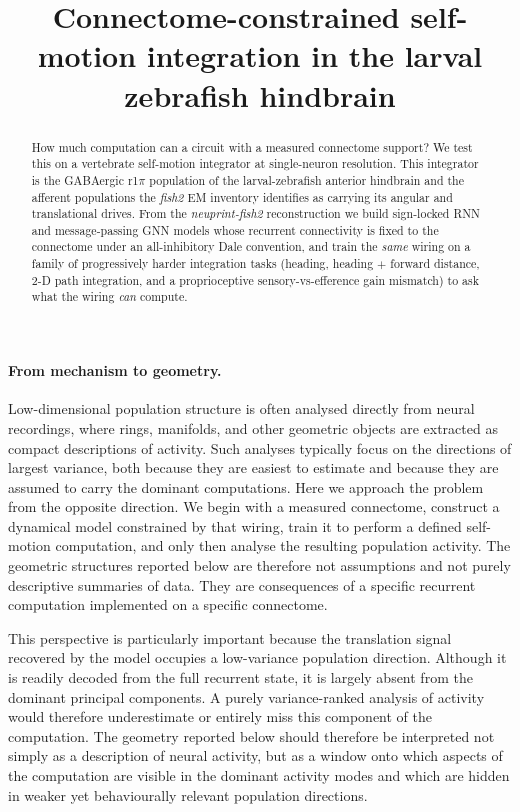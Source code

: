 \documentclass[11pt]{article}
\title{\textbf{Connectome-constrained self-motion integration in the larval
zebrafish hindbrain}}
\author{}
\date{}
\def\rpi{r1\ensuremath{\pi}}
\begin{document}
\maketitle
\begin{abstract}
How much computation can a circuit with a measured connectome support?
We test this on a vertebrate
self-motion integrator at single-neuron resolution. This integrator is the GABAergic
\rpi{} population of the larval-zebrafish anterior hindbrain and the
afferent populations the \emph{fish2} EM inventory identifies as
carrying its angular and translational drives. From the
\emph{neuprint-fish2} reconstruction we build sign-locked RNN and
message-passing GNN models whose recurrent connectivity is fixed to the
connectome under an all-inhibitory Dale convention, and train the
\emph{same} wiring on a family of progressively harder integration
tasks (heading, heading $+$ forward distance, 2-D path integration,
and a proprioceptive sensory-vs-efference gain mismatch) to ask what
the wiring \emph{can} compute.
\end{abstract}

\paragraph{From mechanism to geometry.}
Low-dimensional population structure is often analysed directly from neural
recordings, where rings, manifolds, and other geometric objects are extracted
as compact descriptions of activity. Such analyses typically focus on the
directions of largest variance, both because they are easiest to estimate and
because they are assumed to carry the dominant computations. Here we approach
the problem from the opposite direction. We begin with a measured connectome,
construct a dynamical model constrained by that wiring, train it to perform a
defined self-motion computation, and only then analyse the resulting population
activity. The geometric structures reported below are therefore not assumptions
and not purely descriptive summaries of data. They are consequences of a
specific recurrent computation implemented on a specific connectome.

This perspective is particularly important because the translation signal
recovered by the model occupies a low-variance population direction. Although it
is readily decoded from the full recurrent state, it is largely absent from the
dominant principal components. A purely variance-ranked analysis of activity
would therefore underestimate or entirely miss this component of the
computation. The geometry reported below should therefore be interpreted not
simply as a description of neural activity, but as a window onto which aspects
of the computation are visible in the dominant activity modes and which are
hidden in weaker yet behaviourally relevant population directions.
\end{document}
